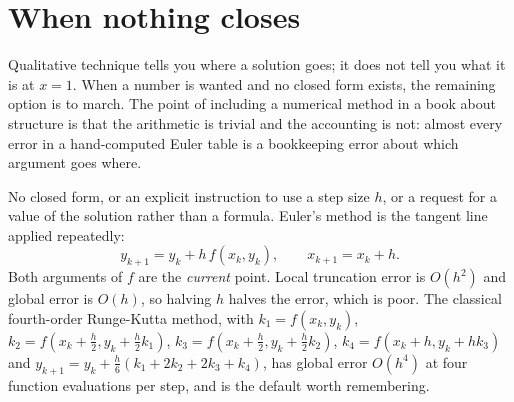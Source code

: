 \section{When nothing closes}

Qualitative technique tells you where a solution goes; it does not tell you what it is at $x=1$. When a number is wanted and no closed form exists, the remaining option is to march. The point of including a numerical method in a book about structure is that the arithmetic is trivial and the accounting is not: almost every error in a hand-computed Euler table is a bookkeeping error about which argument goes where.

\cue No closed form, or an explicit instruction to use a step size $h$, or a request for a value of the solution rather than a formula.
\method Euler's method is the tangent line applied repeatedly:
\[y_{k+1}=y_k+h\,f(x_k,y_k),\qquad x_{k+1}=x_k+h.\]
Both arguments of $f$ are the \emph{current} point. Local truncation error is $O(h^{2})$ and global error is $O(h)$, so halving $h$ halves the error, which is poor. The classical fourth-order Runge-Kutta method, with $k_1=f(x_k,y_k)$, $k_2=f(x_k+\tfrac h2,y_k+\tfrac h2k_1)$, $k_3=f(x_k+\tfrac h2,y_k+\tfrac h2k_2)$, $k_4=f(x_k+h,y_k+hk_3)$ and $y_{k+1}=y_k+\tfrac h6(k_1+2k_2+2k_3+k_4)$, has global error $O(h^{4})$ at four function evaluations per step, and is the default worth remembering.

